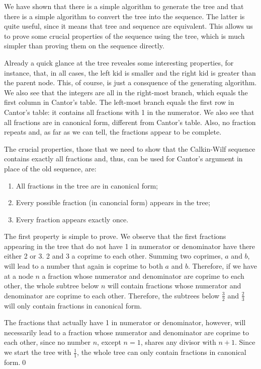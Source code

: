 \documentclass[tikz]{scrreprt}
\begin{document}
We have shown that there is a simple algorithm
to generate the tree and 
that there is a simple algorithm to convert
the tree into the sequence.
The latter is quite useful,
since it means that tree and sequence are equivalent.
This allows us to prove some crucial properties
of the sequence using the tree,
which is much simpler than proving them
on the sequence directly.

Already a quick glance at the tree
reveales some interesting properties,
for instance, that, in all cases,
the left kid is smaller and the right kid
is greater than the parent node.
This, of course, is just a consquence
of the generating algorithm.
We also see that the integers are all
in the right-most branch, which equals
the first column in Cantor's table.
The left-most branch equals the first row
in Cantor's table: it contains all fractions
with 1 in the numerator.
We also see that all fractions are in
canonical form, different from Cantor's table.
Also, no fraction repeats and, as far as we can tell,
the fractions appear to be complete.

The crucial properties, those that we need
to show that the Calkin-Wilf sequence contains
exactly all fractions and, thus, can be used
for Cantor's argument in place of the old sequence,
are:

\begin{enumerate}
\item All fractions in the tree are in canonical form;
\item Every possible fraction (in canoncial form) 
      appears in the tree;
\item Every fraction appears exactly once.
\end{enumerate}

The first property is simple to prove.
We observe that
the first fractions appearing in the tree 
that do not have
1 in numerator or denominator have
there either 2 or 3. 2 and 3 a coprime to each other.
Summing two coprimes, $a$ and $b$, will lead to a number
that again is coprime to both $a$ and $b$.
Therefore, if we have at a node $n$
a fraction whose numerator and denominator
are coprime to each other, the whole subtree
below $n$ will contain fractions whose
numerator and denominator are coprime to each other.
Therefore, the subtrees below $\frac{3}{2}$ and
$\frac{2}{3}$ will only contain fractions in canonical form.

The fractions that actually have 1 in 
numerator or denominator, however,
will necessarily lead to a fraction
whose numerator and denominator are coprime
to each other, since no number $n$, except $n=1$,
shares any divisor with $n+1$.
Since we start the tree with 
$\frac{1}{1}$, the whole tree can only contain
fractions in canonical form.\qed 
\end{document}

